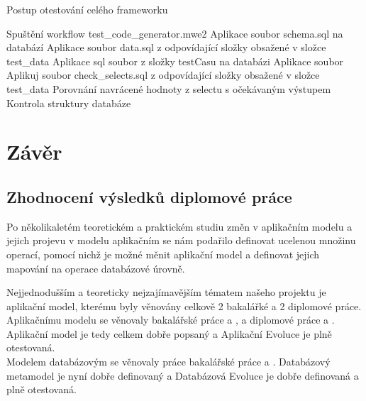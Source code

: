 \documentclass[11pt,twoside,a4paper]{book}
\begin{document}
\begin{algorithm}
 \caption{Postup otestování celého
 frameworku}\label{testing:framework} 
 \begin{algorithmic}[1]
	\State  Spuštění workflow test\_code\_generator.mwe2
		  \State Aplikace soubor schema.sql na databází
		  \State Aplikace soubor data.sql z odpovídající složky obsažené v složce
		  test\_data
		\EndIf
		\State Aplikace sql soubor z složky testCasu na databázi
		   \State Aplikace soubor Aplikuj soubor check\_selects.sql z odpovídající
		   složky obsažené v složce test\_data
		   \State Porovnání navrácené hodnoty z selectu s očekávaným výstupem		    
		\EndIf
		\State Kontrola struktury databáze
	\EndFor
 \end{algorithmic}
 \end{algorithm}




\chapter{Závěr}\label{chapt:zaver}
\section{Zhodnocení výsledků diplomové práce}
Po několikaletém teoretickém a praktickém studiu změn v aplikačním modelu a
jejich projevu v modelu aplikačním se nám podařilo definovat ucelenou množinu
operací, pomocí nichž je možné měnit aplikační model a definovat jejich mapování
na operace databázové úrovně.

Nejjednodušším a teoreticky nejzajímavějším tématem našeho projektu je aplikační
model, kterému byly věnovány celkově 2 bakalářké a 2 diplomové práce.
Aplikačnímu modelu se věnovaly bakalářské práce \cite{Tarant_bp} a 
\cite{Lukes}, a diplomové práce \cite{Tarant_dip} a \cite{Mazanec}. Aplikační
model je tedy celkem dobře popsaný a Aplikační Evoluce je plně
otestovaná.\\

Modelem databázovým se věnovaly práce bakalářské práce \cite{Lukes} a
\cite{Jezek}. Databázový metamodel je nyní dobře definovaný a Databázová Evoluce
je dobře definovaná a plně otestovaná.\\
\end{document}

